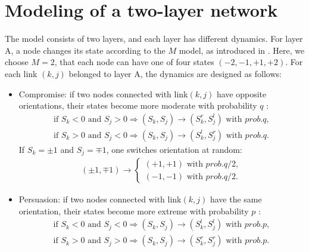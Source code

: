 \section{Modeling of a two-layer network}
\label{sec:modeling of two layer network}
The model consists of two layers, and each layer has different dynamics. For layer A, a node changes its state according to the $M$ model, as introduced in \parencite{rocca2014}. Here, we choose $M=2$, that each node can have one of four states $(-2, -1, +1, +2)$. For each link $(k, j)$ belonged to layer A, the dynamics are designed as follows:
\begin{itemize}
	\item Compromise: if two nodes connected with link$(k, j)$ have opposite orientations, their states become more moderate with probability $q$ :
	\begin{align}
	\mbox{if } S_k<0 \mbox{ and } S_j>0  \Rightarrow (S_k, S_j) \rightarrow (S_k^r, S_j^l) \mbox{ with } prob.q,\\
	\mbox{if } S_k>0 \mbox{ and } S_j<0  \Rightarrow (S_k, S_j) \rightarrow (S_k^l, S_j^r) \mbox{ with } prob.q.
	\end{align}
	If $S_k = \pm1$ and $S_j = \mp1$, one switches orientation at random:
	\begin{align}
	(\pm 1, \mp 1)\rightarrow \left\{\begin{matrix}
	(+1, +1) \mbox{ with } prob.q/2,
	\\(-1, -1)\mbox{ with } prob.q/2.
	\end{matrix}\right.
	\end{align}
		
	\item Persuasion: if two nodes connected with link$(k, j)$ have the same orientation, their states become more extreme with probability $p$ :
	\begin{align}
	\mbox{if } S_k<0 \mbox{ and } S_j<0  \Rightarrow (S_k, S_j) \rightarrow (S_k^l, S_j^l) \mbox{ with } prob.p,\\
	\mbox{if } S_k>0 \mbox{ and } S_j>0  \Rightarrow (S_k, S_j) \rightarrow (S_k^r, S_j^r) \mbox{ with } prob.p.
	\end{align}
\end{itemize}

